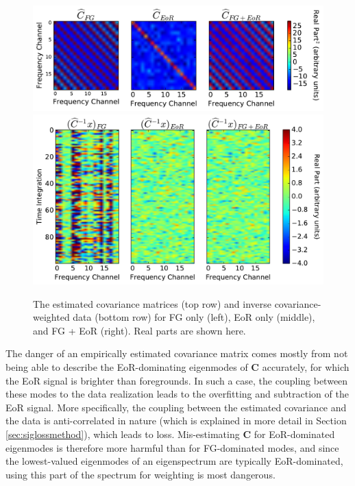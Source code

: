 \documentclass[preprint2,numberedappendix,tighten]{aastex6}
\begin{document}
\begin{figure}
	\centering
	\includegraphics[trim={0cm 0cm 0cm 0cm},clip,width=\columnwidth]{plots/toy_sigloss12.pdf}
	\includegraphics[trim={0cm 0cm 0cm 0cm},clip,width=\columnwidth]{plots/toy_sigloss13.pdf}
	\caption{The estimated covariance matrices (top row) and inverse covariance-weighted data (bottom row) for FG only (left), EoR only 
(middle), and FG + EoR (right). Real parts are shown here.}
	\label{fig:toy_sigloss12}
\end{figure}

The danger of an empirically estimated covariance matrix comes mostly from not being able to describe the EoR-dominating eigenmodes of $
\textbf{C}$ accurately, for which the EoR signal is brighter than foregrounds. In such a case, the coupling between these modes to the data realization leads to the overfitting and subtraction of the EoR signal. More specifically, the coupling between the estimated covariance and the data is anti-correlated in nature (which is explained in more detail in Section \ref{sec:siglossmethod}), which leads to loss. Mis-estimating $\textbf{C}$ for EoR-dominated eigenmodes is therefore more harmful than for FG-dominated modes, and since the lowest-valued eigenmodes of an eigenspectrum are typically EoR-dominated, using this part of the spectrum for weighting is most dangerous.
\end{document}
